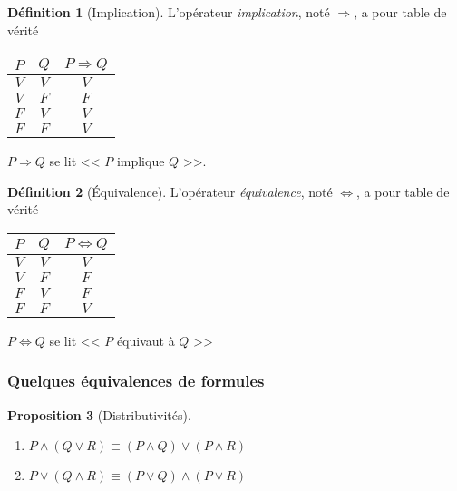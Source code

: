 \documentclass[11pt]{article}
\theoremstyle{definition}
\newtheorem{defn}{Définition}[section]
\newtheorem{prop}[defn]{Proposition}
\theoremstyle{remark}
\begin{document}
\begin{defn}[Implication]
L'opérateur \textit{implication}, noté $\Rightarrow$, a pour table de vérité

\begin{table}[ht]
\centering
\begin{tabular}{|c|c|c|}\hline
$P$ & $Q$ & $P\Rightarrow Q$ \\ \hline
$V$ & $V$ & $V$ \\\hline
$V$ & $F$ & $F$ \\\hline
$F$ & $V$ & $V$ \\\hline
$F$ & $F$ & $V$ \\\hline
\end{tabular}
\end{table}

$P\Rightarrow Q$ se lit << $P$ implique $Q$ >>.
\end{defn}

\begin{defn}[Équivalence]
L'opérateur \textit{équivalence}, noté $\Leftrightarrow$, a pour table de vérité

\begin{table}[ht]
\centering
\begin{tabular}{|c|c|c|}\hline
$P$ & $Q$ & $P\Leftrightarrow Q$ \\ \hline
$V$ & $V$ & $V$ \\\hline
$V$ & $F$ & $F$ \\\hline
$F$ & $V$ & $F$ \\\hline
$F$ & $F$ & $V$ \\\hline
\end{tabular}
\end{table}

$P\Leftrightarrow Q$ se lit << $P$ équivaut à $Q$ >>
\end{defn}




\subsubsection{Quelques équivalences de formules}

\begin{prop}[Distributivités]\leavevmode
\begin{enumerate}
\item $P\land (Q\lor R) \equiv(P\land Q)\lor (P\land R)$
\item $P\lor(Q\land R)\equiv (P\lor Q)\land (P\lor R)$
\end{enumerate}

\end{prop}
\end{document}

